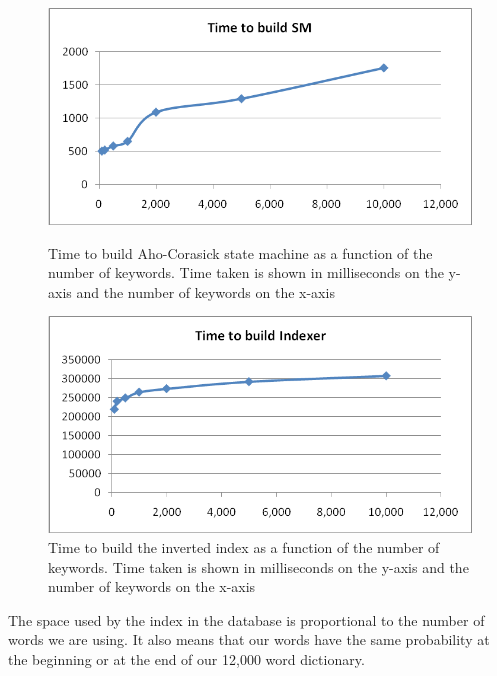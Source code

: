 \documentclass[10pt]{article}
\begin{document}
\begin{figure}[ht]
  \begin{minipage}[b]{0.5\linewidth}
    \centering
    \includegraphics[width=\textwidth]{numkeywordstimecomplexbuildsm}
    \caption{Time to build Aho-Corasick state machine as a function of
      the number of keywords. Time taken is shown in milliseconds on the
      y-axis and the number of keywords on the x-axis}
    \label{fig:numkeywordstimecomplexbuildsm}
  \end{minipage}
  \hspace{0.5cm}
  \begin{minipage}[b]{0.5\linewidth}
    \centering
    \includegraphics[width=\textwidth]{numkeywordstimecomplexbuildindex}
    \caption{Time to build the inverted index as a function of the
      number of keywords. Time taken is shown in milliseconds on the
      y-axis and the number of keywords on the x-axis}
    \label{fig:numkeywordstimecomplexbuildindex}
  \end{minipage}
\end{figure}

The space used by the index in the database is proportional to the
number of words we are using. It also means that our words have the
same probability at the beginning or at the end of our 12,000 word
dictionary.
\end{document}
